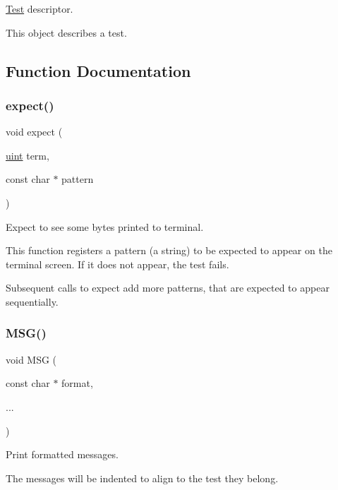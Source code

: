 \hyperlink{structTest}{Test} descriptor. 

This object describes a test. 

\subsection{Function Documentation}
\mbox{\label{group__Testing_ga0c4e801b8c3317b802fa4e80e1e26de2}} 
\subsubsection{\texorpdfstring{expect()}{expect()}}
{\footnotesize\ttfamily void expect (\begin{DoxyParamCaption}\item[{\hyperlink{bios_8h_a91ad9478d81a7aaf2593e8d9c3d06a14}{uint}}]{term,  }\item[{const char $\ast$}]{pattern }\end{DoxyParamCaption})}



Expect to see some bytes printed to terminal. 

This function registers a {\ttfamily pattern} (a string) to be expected to appear on the terminal screen. If it does not appear, the test fails.

Subsequent calls to expect add more patterns, that are expected to appear sequentially. \mbox{\label{group__Testing_ga2e36933a48fbca44bb782f881ddceb20}} 
\subsubsection{\texorpdfstring{M\+S\+G()}{MSG()}}
{\footnotesize\ttfamily void M\+SG (\begin{DoxyParamCaption}\item[{const char $\ast$}]{format,  }\item[{}]{... }\end{DoxyParamCaption})}



Print formatted messages. 

The messages will be indented to align to the test they belong. \mbox{\label{group__Testing_ga4663cf3fb390b2a6d9cf1943f21b9934}} 
